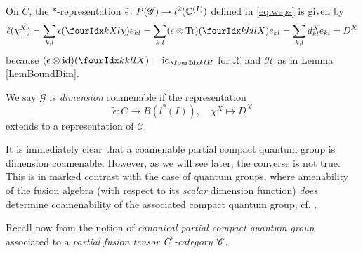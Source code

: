On $C$, the $*$-representation $\operatorname{\tilde{\epsilon}} \colon P(\mathscr{G})
\to l^{2}(\mathbb{C}^{(I)})$ defined in
\eqref{eq:weps} is given by
\begin{align*}
  \weps(\chi^{X}) = \sum_{k,l} \epsilon(\Gr{\chi}{}{X}{k}{l})e_{kl} =
  \sum_{k,l} (\epsilon \otimes \Tr)(\Gr{X}{k}{l}{k}{l}) e_{kl}
   = \sum_{k,l} d^{X}_{kl} e_{kl} =D^{X}
\end{align*}
because $(\epsilon \otimes
\id)(\Gr{X}{k}{l}{k}{l})=\id_{\Gru{H}{k}{l}}$  for   $\mathscr{X}$ and
$\mathcal{H}$ as in Lemma \ref{LemBoundDim}.



\begin{Def} We say $\mathscr{G}$ is \emph{dimension} coamenable %
if the representation \[\tilde{\epsilon}: C \rightarrow B(l^2(I)), \quad \chi^X \mapsto D^X\] extends to a representation of $\mathcal{C}$.
\end{Def}

It is immediately clear that a coamenable partial compact quantum group is dimension coamenable. However, as we will see later, the converse is not true. This is in marked contrast with the case of quantum groups, where amenability of the fusion algebra (with respect to its \emph{scalar} dimension function) \emph{does} determine coamenability of the associated compact quantum group, cf. \cite[Theorem 4.5]{Kye1}.
 

Recall now from \cite[Definition 1.23 and Section 4.1]{DCT1} the notion of \emph{canonical partial compact quantum group} associated to a \emph{partial fusion tensor C$^*$-category $\mathscr{C}$}.

